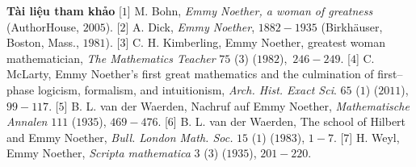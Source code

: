 \begin{multicols}{2}
	\vskip 0.05cm
	\textbf{\color{lichsutoanhoc}Tài liệu tham khảo}
	\vskip 0.05cm
	[$1$] M. Bohn, \textit{Emmy Noether, a woman of greatness} (AuthorHouse, $2005$).
	\vskip 0.05cm
	[$2$] A. Dick, \textit{Emmy Noether}, $1882-1935$ (Birkhäuser, Boston, Mass., $1981$).
	\vskip 0.05cm
	[$3$] C. H. Kimberling, Emmy Noether, greatest woman mathematician, \textit{The Mathematics Teacher} $75$ ($3$) ($1982$),~$246-249$.
	\vskip 0.05cm
	[$4$] C. McLarty, Emmy Noether's first great mathematics and the culmination of first--phase logicism, formalism, and intuitionism, \textit{Arch. Hist. Exact Sci}. $65$ ($1$) ($2011$), $99-117$.
	\vskip 0.05cm
	[$5$] B. L. van der Waerden, Nachruf auf Emmy Noether, \textit{Mathematische Annalen} $111$ ($1935$), $469-476$.
	\vskip 0.05cm
	[$6$] B. L. van der Waerden, The school of Hilbert and Emmy Noether, \textit{Bull. London Math. Soc.} $15$ ($1$) ($1983$), $1-7$.
	\vskip 0.05cm
	[$7$] H. Weyl, Emmy Noether, \textit{Scripta mathematica} $3$ ($3$) ($1935$), $201-220$.
\end{multicols}
\newpage
{}
\begingroup
{}
\centering
\endgroup

